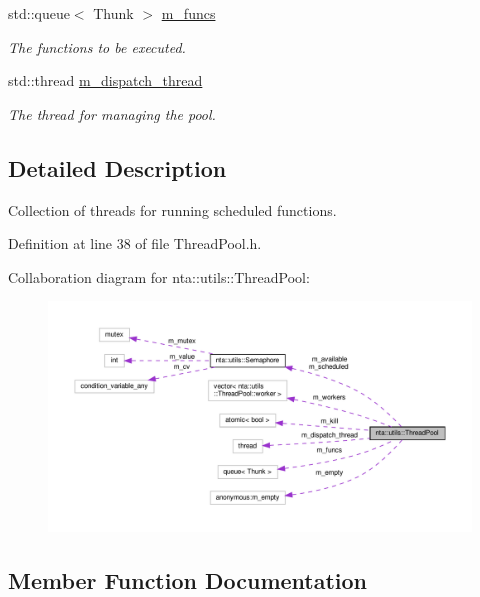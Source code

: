 \begin{DoxyCompactItemize}
std\+::queue$<$ Thunk $>$ \hyperlink{classnta_1_1utils_1_1ThreadPool_a828f1c41f02f5ecce36e72a2a3328eb3}{m\+\_\+funcs}
\begin{DoxyCompactList}\small\item\em The functions to be executed. \end{DoxyCompactList}\item 
\mbox{\label{classnta_1_1utils_1_1ThreadPool_a6fe6bfa4607803f5f3f9b64b47c0417a}} 
std\+::thread \hyperlink{classnta_1_1utils_1_1ThreadPool_a6fe6bfa4607803f5f3f9b64b47c0417a}{m\+\_\+dispatch\+\_\+thread}
\begin{DoxyCompactList}\small\item\em The thread for managing the pool. \end{DoxyCompactList}\end{DoxyCompactItemize}


\subsection{Detailed Description}
Collection of threads for running scheduled functions. 

Definition at line 38 of file Thread\+Pool.\+h.



Collaboration diagram for nta\+:\+:utils\+:\+:Thread\+Pool\+:\nopagebreak
\begin{figure}[H]
\begin{center}
\leavevmode
\includegraphics[width=350pt]{d2/d5d/classnta_1_1utils_1_1ThreadPool__coll__graph}
\end{center}
\end{figure}


\subsection{Member Function Documentation}
\mbox{\label{classnta_1_1utils_1_1ThreadPool_a2ca98ba5ed4510e5aac90c0507859b8d}} 
